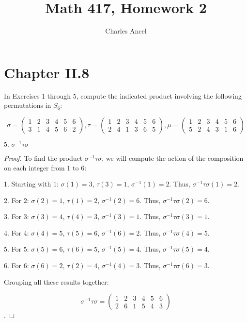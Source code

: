 \documentclass[12pt]{amsart}
\title{Math 417, Homework 2}
\author{Charles Ancel}
\theoremstyle{definition}
\numberwithin{equation}{section}
\theoremstyle{plain}
\begin{document}
\maketitle

\section*{Chapter II.8}
\begin{exercise}{5} 
    In Exercises 1 through 5, compute the indicated product involving the following permutations in \(S_6\):
    
    \[\sigma =
    \begin{pmatrix}
    1 & 2 & 3 & 4 & 5 & 6 \\
    3 & 1 & 4 & 5 & 6 & 2
    \end{pmatrix} , 
    \tau=
    \begin{pmatrix} 
        1 & 2 & 3 & 4 & 5 & 6 \\
        2 &4 &1& 3& 6& 5
    \end{pmatrix} , 
    \mu=
    \begin{pmatrix}
        1 & 2 & 3 & 4 & 5 & 6 \\
        5 &2 &4 &3 &1 &6
    \end{pmatrix}\]
    
    \(\text{5. }\sigma^{-1}\tau\sigma\)
    
    \begin{proof}
    To find the product \(\sigma^{-1}\tau\sigma\), we will compute the action of the composition on each integer from \(1\) to \(6\):
    
    1. Starting with \(1\):
    \(\sigma(1) = 3\), 
    \(\tau(3) = 1\),
    \(\sigma^{-1}(1) = 2\).
    Thus, \(\sigma^{-1}\tau\sigma(1) = 2\).
    
    2. For \(2\):
    \(\sigma(2) = 1\), 
    \(\tau(1) = 2\),
    \(\sigma^{-1}(2) = 6\).
    Thus, \(\sigma^{-1}\tau\sigma(2) = 6\).
    
    3. For \(3\):
    \(\sigma(3) = 4\), 
    \(\tau(4) = 3\),
    \(\sigma^{-1}(3) = 1\).
    Thus, \(\sigma^{-1}\tau\sigma(3) = 1\).
    
    4. For \(4\):
    \(\sigma(4) = 5\), 
    \(\tau(5) = 6\),
    \(\sigma^{-1}(6) = 2\).
    Thus, \(\sigma^{-1}\tau\sigma(4) = 5\).
    
    5. For \(5\):
    \(\sigma(5) = 6\), 
    \(\tau(6) = 5\),
    \(\sigma^{-1}(5) = 4\).
    Thus, \(\sigma^{-1}\tau\sigma(5) = 4\).
    
    6. For \(6\):
    \(\sigma(6) = 2\), 
    \(\tau(2) = 4\),
    \(\sigma^{-1}(4) = 3\).
    Thus, \(\sigma^{-1}\tau\sigma(6) = 3\).
    
    Grouping all these results together:
    
    \[\sigma^{-1}\tau\sigma =
    \begin{pmatrix}
        1 & 2 & 3 & 4 & 5 & 6 \\
        2 & 6 & 1 & 5 & 4 & 3
    \end{pmatrix}\].
    
    \end{proof}
    \end{exercise}
\end{document}
